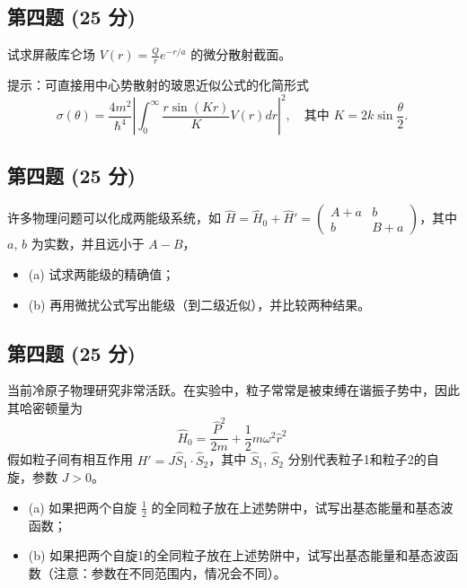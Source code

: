 \subsection{第四题 (25 分)}
试求屏蔽库仑场 $V(r) = \frac{Q}{r}e^{-r/a}$ 的微分散射截面。

提示：可直接用中心势散射的玻恩近似公式的化简形式
\[\sigma(\theta) = \frac{4m^2}{\hbar^4} \left| \int_0^\infty \frac{r \sin(Kr)}{K} V(r) dr \right|^2, \quad \text{其中 } K = 2k \sin\frac{\theta}{2}.~\]
\subsection{第四题 (25 分)}
许多物理问题可以化成两能级系统，如 $\hat{H} = \hat{H}_0 + \hat{H}' = 
\begin{pmatrix}
A + a & b \\
b & B + a
\end{pmatrix}$，其中 $a$, $b$ 为实数，并且远小于 $A - B$，
\begin{itemize}
  \item (a) 试求两能级的精确值；
  \item (b) 再用微扰公式写出能级（到二级近似），并比较两种结果。
\end{itemize}
\subsection{第四题 (25 分)}
当前冷原子物理研究非常活跃。在实验中，粒子常常是被束缚在谐振子势中，因此其哈密顿量为
\[\hat{H}_0 = \frac{\hat{P}^2}{2m} + \frac{1}{2} m \omega^2 \hat{r}^2~\]
假如粒子间有相互作用 $H' = J \hat{S}_1 \cdot \hat{S}_2$，其中 $\hat{S}_1$, $\hat{S}_2$ 分别代表粒子1和粒子2的自旋，参数 $J > 0$。
\begin{itemize}
  \item (a) 如果把两个自旋 $\frac{1}{2}$ 的全同粒子放在上述势阱中，试写出基态能量和基态波函数；
  \item (b) 如果把两个自旋1的全同粒子放在上述势阱中，试写出基态能量和基态波函数（注意：参数在不同范围内，情况会不同）。
\end{itemize}